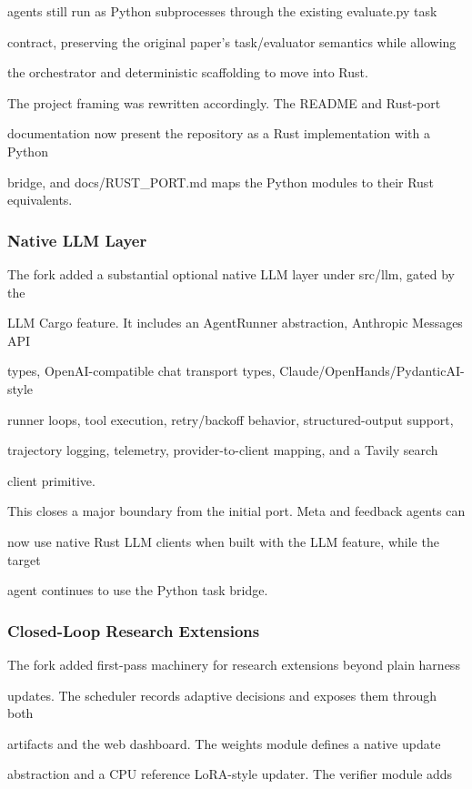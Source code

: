 \documentclass[twocolumn,10pt,letterpaper]{article}
\begin{document}
agents still run as Python subprocesses through the existing evaluate.py task

contract, preserving the original paper's task/evaluator semantics while allowing

the orchestrator and deterministic scaffolding to move into Rust.


The project framing was rewritten accordingly. The README and Rust-port

documentation now present the repository as a Rust implementation with a Python

bridge, and docs/RUST\_PORT.md maps the Python modules to their Rust equivalents.


\subsubsection{Native LLM Layer}

The fork added a substantial optional native LLM layer under src/llm, gated by the

LLM Cargo feature. It includes an AgentRunner abstraction, Anthropic Messages API

types, OpenAI-compatible chat transport types, Claude/OpenHands/PydanticAI-style

runner loops, tool execution, retry/backoff behavior, structured-output support,

trajectory logging, telemetry, provider-to-client mapping, and a Tavily search

client primitive.


This closes a major boundary from the initial port. Meta and feedback agents can

now use native Rust LLM clients when built with the LLM feature, while the target

agent continues to use the Python task bridge.


\subsubsection{Closed-Loop Research Extensions}

The fork added first-pass machinery for research extensions beyond plain harness

updates. The scheduler records adaptive decisions and exposes them through both

artifacts and the web dashboard. The weights module defines a native update

abstraction and a CPU reference LoRA-style updater. The verifier module adds
\end{document}
